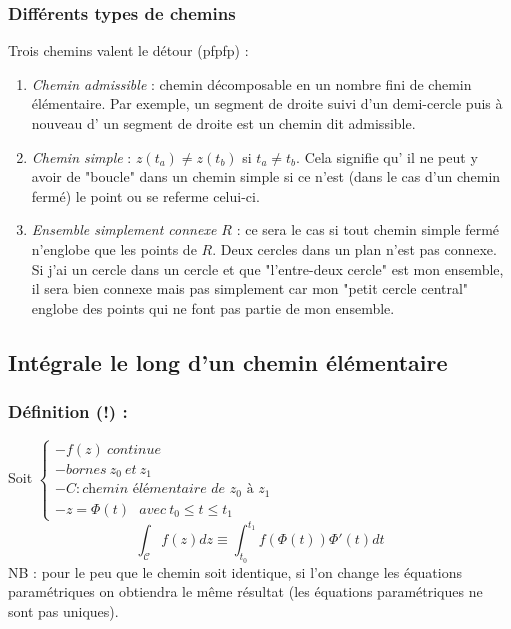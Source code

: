 \subsubsection{Différents types de chemins}
Trois chemins valent le détour (pfpfp) :
\begin{enumerate}
	\item \textit{Chemin admissible} : chemin décomposable en un nombre fini de chemin
	      élémentaire. Par exemple, un segment de droite suivi d'un demi-cercle puis à nouveau d'
	      un segment de droite est un chemin dit admissible.
	\item \textit{Chemin simple} : $z(t_a) \neq z(t_b)$ si $t_a \neq t_b$. Cela signifie qu'
	      il ne peut y avoir de "boucle" dans un chemin simple si ce n'est (dans le cas d'un chemin
	      fermé) le point ou se referme celui-ci.
	\item \textit{Ensemble simplement connexe $R$} : ce sera le cas si tout chemin simple fermé
	      n'englobe que les points de $R$. Deux cercles dans un plan n'est pas connexe. Si j'ai un
	      cercle dans un cercle et que "l'entre-deux cercle" est mon ensemble, il sera bien connexe
	      mais pas simplement car mon "petit cercle central" englobe des points qui ne font pas partie
	      de mon ensemble.
\end{enumerate}
    
\subsection{Intégrale le long d'un chemin élémentaire}
\subsubsection{Définition (!) :}
Soit $\left\{\begin{array}{l}
- f(z)\ continue\\
- bornes\ z_0\ et\ z_1\\
- C : \textit{chemin élémentaire de $z_0$ à $z_1$}\\
- z = \Phi(t)\ \ \ avec\ t_0 \leq t \leq t_1
\end{array}\right.$ 
\begin{equation}
	\int_\mathcal{C} f(z) dz \equiv \int_{t_0}^{t_1} f(\Phi(t))\Phi'(t) dt
\end{equation}
NB : pour le peu que le chemin soit identique, si l'on change les équations paramétriques on 
obtiendra le même résultat (les équations paramétriques ne sont pas uniques).\\
    
